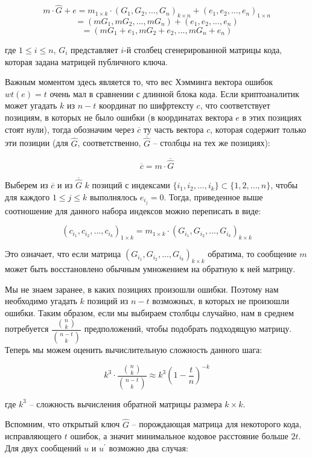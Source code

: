 \documentclass[12pt,a4paper]{scrartcl}
\begin{document}
$$m \cdot \hat{G} + e = m_{1\times k} \cdot (G_1, G_2,...,G_n)_{k\times n}+(e_1,e_2,...,e_n)_{1\times n}$$
$$=(mG_1,mG_2,...,mG_n)+(e_1,e_2,...,e_n)$$
$$=(mG_1+e_1,mG_2+e_2,...,mG_n+e_n)$$

где $1 \leq i \leq n$, $G_i$ представляет $i$-й столбец сгенерированной матрицы кода, которая задана матрицей публичного ключа.

Важным моментом здесь является то, что вес Хэмминга вектора ошибок $wt(e)=t$ очень мал в сравнении с длинной блока кода. Если криптоаналитик может угадать $k$ из $n - t$ координат по шифртексту $c$, что соответствует позициям, в которых не было ошибки (в координатах вектора $e$ в этих позициях стоят нули), тогда обозначим через $\overline{c}$ ту часть вектора $c$, которая содержит только эти позиции (для $\hat{G}$, соответственно, $\overline{\hat{G}}$ -- столбцы на тех же позициях):

$$\overline{c} = m \cdot \overline{\hat{G}}$$

Выберем из $\overline{c}$ и из $\overline{\hat{G}}$ $k$ позиций с индексами $\{i_1,i_2,...,i_k\} \subset \{1,2,...,n\}$, чтобы для каждого $1 \leq j \leq k$ выполнялось $e_{i_j} = 0$. Тогда, приведенное выше соотношение для данного набора индексов можно переписать в виде:

$$(c_{i_1},c_{i_2},...,c_{i_k})_{1\times k} = m_{1\times k}\cdot (G_{i_1},G_{i_2},...,G_{i_k})_{k\times k}$$

Это означает, что если матрица $(G_{i_1},G_{i_2},...,G_{i_k})_{k\times k}$ обратима, то сообщение $m$ может быть восстановлено обычным умножением на обратную к ней матрицу. 

Мы не знаем заранее, в каких позициях произошли ошибки. Поэтому нам необходимо угадать $k$ позиций из $n-t$ возможных, в которых не произошли ошибки. Таким образом, если мы выбираем столбцы случайно, нам в среднем потребуется $\dfrac{\binom{n}{k}}{\binom{n-t}{k}}$ предположений, чтобы подобрать подходящую матрицу. Теперь мы можем оценить вычислительную сложность данного шага:

$$k^3 \cdot \dfrac{\binom{n}{k}}{\binom{n-t}{k}} \approx k^3 \left( 1- \dfrac{t}{n} \right)^{-k}$$

где $k^3$ -- сложность вычисления обратной матрицы размера $k\times k$.

Вспомним, что открытый ключ $\hat{G}$ -- порождающая матрица для некоторого кода, исправляющего $t$ ошибок, а значит минимальное кодовое расстояние больше $2t$. Для двух сообщений $u$ и $u^\prime$ возможно два случая:
\end{document}
